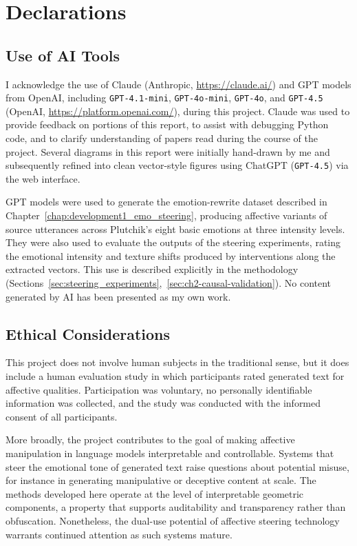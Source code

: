 \chapter*{Declarations}

\section*{Use of AI Tools}

I acknowledge the use of Claude (Anthropic, \url{https://claude.ai/}) and GPT models from OpenAI, including \texttt{GPT-4.1-mini}, \texttt{GPT-4o-mini}, \texttt{GPT-4o}, and \texttt{GPT-4.5} (OpenAI, \url{https://platform.openai.com/}), during this project. Claude was used to provide feedback on portions of this report, to assist with debugging Python code, and to clarify understanding of papers read during the course of the project. Several diagrams in this report were initially hand-drawn by me and subsequently refined into clean vector-style figures using ChatGPT (\texttt{GPT-4.5}) via the web interface.\par

GPT models were used to generate the emotion-rewrite dataset described in Chapter~\ref{chap:development1_emo_steering}, producing affective variants of source utterances across Plutchik's eight basic emotions at three intensity levels. They were also used to evaluate the outputs of the steering experiments, rating the emotional intensity and texture shifts produced by interventions along the extracted vectors. This use is described explicitly in the methodology (Sections~\ref{sec:steering_experiments},~\ref{sec:ch2-causal-validation}). No content generated by AI has been presented as my own work. \par

\section*{Ethical Considerations}

This project does not involve human subjects in the traditional sense, but it does include a human evaluation study in which participants rated generated text for affective qualities. Participation was voluntary, no personally identifiable information was collected, and the study was conducted with the informed consent of all participants.\par

More broadly, the project contributes to the goal of making affective manipulation in language models interpretable and controllable. Systems that steer the emotional tone of generated text raise questions about potential misuse, for instance in generating manipulative or deceptive content at scale. The methods developed here operate at the level of interpretable geometric components, a property that supports auditability and transparency rather than obfuscation. Nonetheless, the dual-use potential of affective steering technology warrants continued attention as such systems mature.\par

